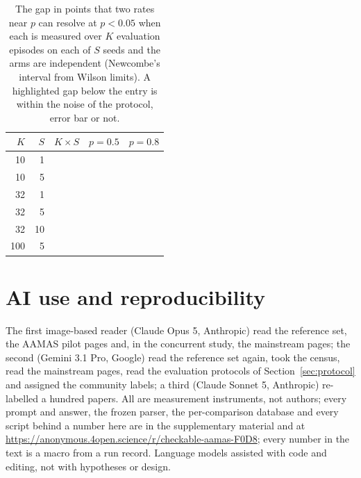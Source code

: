 \documentclass[sigconf,anonymous]{aamas}
\begin{document}
\begin{table}[t]
\caption{The gap in points that two rates near $p$ can resolve at
$p < 0.05$ when each is measured over $K$ evaluation episodes on each of
$S$ seeds and the arms are independent (Newcombe's interval from Wilson
limits). A highlighted gap below the entry is within the noise of the
protocol, error bar or not.}
\label{tab:lookup}
\scriptsize
\centering
\setlength{\tabcolsep}{5pt}
\begin{tabular}{@{}rrrrr@{}}
\toprule
$K$ & $S$ & $K \times S$ & $p = 0.5$ & $p = 0.8$ \\
\midrule
10 & 1 & \nLkKOZSON{} & \nLkKOZSOHalf{} & \nLkKOZSOEighty{} \\
10 & 5 & \nLkKOZSSN{} & \nLkKOZSSHalf{} & \nLkKOZSSEighty{} \\
32 & 1 & \nLkKTTSON{} & \nLkKTTSOHalf{} & \nLkKTTSOEighty{} \\
32 & 5 & \nLkKTTSSN{} & \nLkKTTSSHalf{} & \nLkKTTSSEighty{} \\
32 & 10 & \nLkKTTSOZN{} & \nLkKTTSOZHalf{} & \nLkKTTSOZEighty{} \\
100 & 5 & \nLkKOZZSSN{} & \nLkKOZZSSHalf{} & \nLkKOZZSSEighty{} \\
\bottomrule
\end{tabular}
\end{table}

\section*{AI use and reproducibility}
The first image-based reader (Claude Opus 5, Anthropic) read the reference
set, the AAMAS pilot pages and, in the concurrent study, the mainstream
pages; the second (Gemini 3.1 Pro, Google) read the reference set again,
took the census, read the mainstream pages, read the evaluation protocols
of Section~\ref{sec:protocol} and assigned the community labels; a third
(Claude Sonnet 5, Anthropic) re-labelled a hundred papers. All are
measurement instruments, not authors; every prompt and answer, the frozen
parser, the per-comparison database and every script behind a number here
are in the supplementary material and at
\url{https://anonymous.4open.science/r/checkable-aamas-F0D8}; every number
in the text is a macro from a run record. Language models assisted with
code and editing, not with hypotheses or design.

\balance


\end{document}
